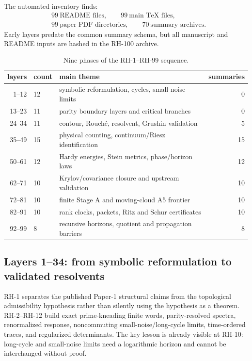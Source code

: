 \documentclass[11pt]{article}
\theoremstyle{definition}
\theoremstyle{remark}
\begin{document}
The automated inventory finds:
\begin{align*}
  &99\ \text{README files},\qquad
    99\ \text{main TeX files},\\
  &99\ \text{paper-PDF directories},\qquad
    70\ \text{summary archives}.
\end{align*}
Early layers predate the common summary schema, but all manuscript and README
inputs are hashed in the RH-100 archive.

\begin{table}[t]
\centering
\caption{Nine phases of the RH-1--RH-99 sequence.}
\label{tab:phases}
\begin{tabular}{@{}rllr@{}}
\toprule
layers & count & main theme & summaries\\
\midrule
1--12  & 12 & symbolic reformulation, cycles, small-noise limits & 0\\
13--23 & 11 & parity boundary layers and critical branches & 0\\
24--34 & 11 & contour, Rouch\'e, resolvent, Grushin validation & 5\\
35--49 & 15 & physical counting, continuum/Riesz identification & 15\\
50--61 & 12 & Hardy energies, Stein metrics, phase/horizon laws & 12\\
62--71 & 10 & Krylov/covariance closure and upstream validation & 10\\
72--81 & 10 & finite Stage A and moving-cloud A5 frontier & 10\\
82--91 & 10 & rank clocks, packets, Ritz and Schur certificates & 10\\
92--99 & 8  & recursive horizons, quotient and propagation barriers & 8\\
\bottomrule
\end{tabular}
\end{table}

\subsection{Layers 1--34: from symbolic reformulation to validated resolvents}

RH-1 separates the published Paper-1 structural claims from the topological
admissibility hypothesis rather than silently using the hypothesis as a
theorem.  RH-2--RH-12 build exact prime-kneading finite words, parity-resolved
spectra, renormalized response, noncommuting small-noise/long-cycle limits,
time-ordered traces, and regularized determinants.  The key lesson is already
visible at RH-10: long-cycle and small-noise limits need a logarithmic horizon
and cannot be interchanged without proof.
\end{document}
